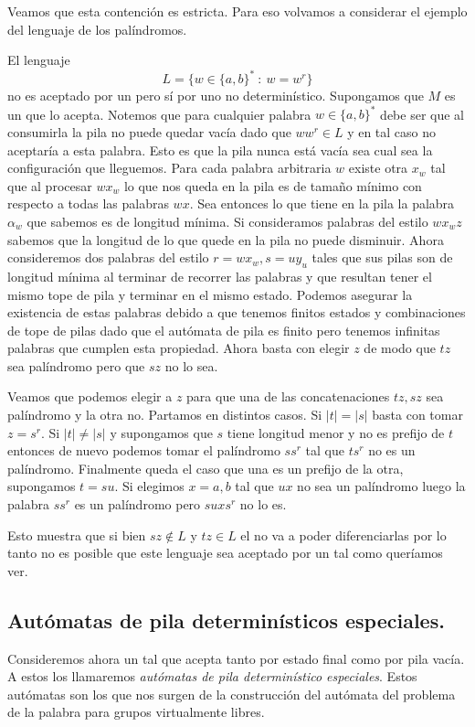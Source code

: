 \documentclass[tesis.tex]{subfiles}
\begin{document}
Veamos que esta contención es estricta. Para eso volvamos a considerar el ejemplo del lenguaje de los palíndromos.
\begin{ej}
	El lenguaje 
	\[
	L = \{ w \in \{ a,b \}^*  \ : \ w = w^r \}
	\]
	 no es aceptado por un \APD pero sí por uno no determinístico. 
	Supongamos que $M$ es un \APD que lo acepta. 
	Notemos que para cualquier palabra $w \in \{ a,b \}^*$ debe ser que al consumirla la pila no puede quedar vacía dado que $ww^r \in L$ y en tal caso no aceptaría a esta palabra. 
	Esto es que la pila nunca está vacía sea cual sea la configuración que lleguemos. 
	Para cada palabra arbitraria $w$ existe otra $x_w$ tal que al procesar $wx_w$ lo que nos queda en la pila es de tamaño mínimo con respecto a todas las palabras $wx$. 
	Sea entonces lo que tiene en la pila la palabra $\alpha_w$ que sabemos es de longitud mínima. Si consideramos palabras del estilo $wx_wz$ sabemos que la longitud de lo que quede en la pila no puede disminuir. 
	Ahora consideremos dos palabras del estilo $r=wx_w, s=uy_u$ tales que sus pilas son de longitud mínima al terminar de recorrer las palabras y que resultan tener el mismo tope de pila y terminar en el mismo estado. 
	Podemos asegurar la existencia de estas palabras debido a que tenemos finitos estados y combinaciones de tope de pilas dado que el autómata de pila es finito pero tenemos infinitas palabras que cumplen esta propiedad. 
	Ahora basta con elegir $z$ de modo que $tz$ sea palíndromo pero que $sz$ no lo sea. 
	
	Veamos que podemos elegir a $z$ para que una de las concatenaciones $tz,sz$ sea palíndromo y la otra no. Partamos en distintos casos. 
	Si $|t|=|s|$ basta con tomar $z=s^r$. 
	Si $|t|\neq |s|$ y supongamos que $s$ tiene longitud menor y no es prefijo de $t$ entonces de nuevo podemos tomar el palíndromo $ss^r$ tal que $ts^r$ no es un palíndromo. 
	Finalmente queda el caso que una es un prefijo de la otra, supongamos $t=su$. 
	Si elegimos $x=a,b$ tal que $ux$ no sea un palíndromo luego la palabra $ss^r$ es un palíndromo pero $suxs^r$ no lo es.
	
	Esto muestra que si bien $sz \notin L$ y $tz \in L$ el \APD no va a poder diferenciarlas por lo tanto no es posible que este lenguaje sea aceptado por un \APD tal como queríamos ver.
	
\end{ej}

\subsection{Autómatas de pila determinísticos especiales.} 
Consideremos ahora un \APD tal que acepta tanto por estado final como por pila vacía. A estos los llamaremos \textit{autómatas de pila determinístico especiales}.  
Estos autómatas son los que nos surgen de la construcción del autómata del problema de la palabra  para grupos virtualmente libres. 
\end{document}
